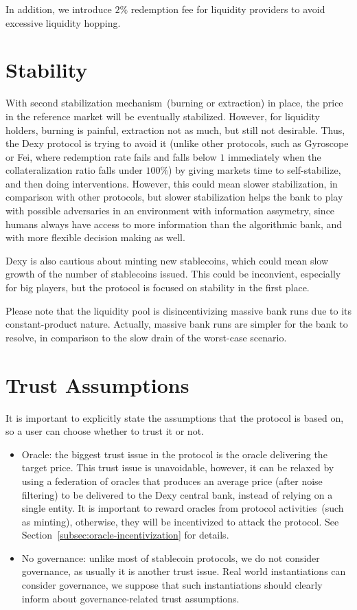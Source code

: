 \documentclass[a4paper,UKenglish,cleveref, autoref, thm-restate]{lipics-v2021}
\newcommand{\sct}{stablecoin}
\newcommand{\dx}{Dexy}
\begin{document}
In addition, we introduce $2\%$ redemption fee for liquidity providers to avoid excessive liquidity hopping.

\section{Stability}
\label{sec:stability}

With second stabilization mechanism~(burning or extraction) in place, the price in the reference market will be eventually stabilized. However, for liquidity holders, burning is painful, extraction not as much, but still not desirable. Thus, the \dx{} protocol is trying to avoid it (unlike other protocols, such as Gyroscope or Fei, where redemption rate fails and falls below $1$ immediately when the collateralization ratio falls under $100\%$) by giving markets time to self-stabilize, and then doing interventions. However, this could mean slower stabilization, in comparison with other protocols, but slower stabilization helps the bank to play with possible adversaries in an environment with information assymetry, since humans always have access to more information than the algorithmic bank, and with more flexible decision making as well.

\dx{} is also cautious about minting new \sct{}s, which could mean slow growth of the number of stablecoins issued. This could be inconvient, especially for big players, but the protocol is focused on stability in the first place. 

Please note that the liquidity pool is disincentivizing massive bank runs due to its constant-product nature. Actually, massive bank runs are simpler for the bank to resolve, in comparison to the slow drain of the worst-case scenario.

\section{Trust Assumptions}
\label{sec:kya}

It is important to explicitly state the assumptions that the protocol is based on, so a user can choose whether to trust it or not.

\begin{itemize}
  \item{Oracle:} the biggest trust issue in the protocol is the oracle delivering the target price. This trust issue is unavoidable, however, it can be relaxed by using a federation of oracles that produces an average price (after noise filtering) to be delivered to the Dexy central bank, instead of relying on a single entity.
  It is important to reward oracles from protocol activities~(such as minting), otherwise, they will be incentivized to attack the protocol. See Section~\ref{subsec:oracle-incentivization} for details.

  \item{No governance:} unlike most of stablecoin protocols, we do not consider governance, as usually it is another trust issue. Real world instantiations can consider governance, we suppose that such instantiations should clearly inform about governance-related trust assumptions.
\end{itemize}
\end{document}
